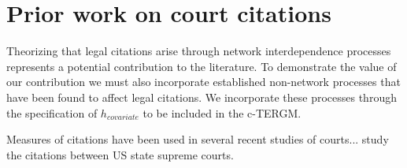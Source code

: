 \documentclass[headsepline=true, abstracton]{scrartcl}
\begin{document}
\section{Prior work on court citations}

Theorizing that legal citations arise through network interdependence processes  represents a potential contribution to the literature. To demonstrate the value of our contribution we must also incorporate established non-network processes that have been found to affect legal citations. We incorporate these processes through the specification of $h_{covariate}$ to be included in the c-TERGM. 

Measures of citations have been used in several recent studies of courts...\citet{hinkle2016transmission} study the citations between US state supreme courts.
\end{document}
